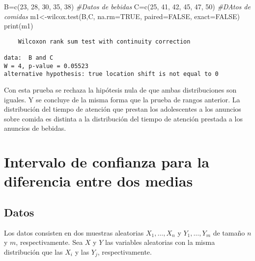 \documentclass[
  a4paper,
  oneside,
  openany]{book}
\newenvironment{Shaded}{\begin{snugshade}}{\end{snugshade}}
\newcommand{\AttributeTok}[1]{\textcolor[rgb]{0.77,0.63,0.00}{#1}}
\newcommand{\CommentTok}[1]{\textcolor[rgb]{0.56,0.35,0.01}{\textit{#1}}}
\newcommand{\ConstantTok}[1]{\textcolor[rgb]{0.00,0.00,0.00}{#1}}
\newcommand{\DecValTok}[1]{\textcolor[rgb]{0.00,0.00,0.81}{#1}}
\newcommand{\FunctionTok}[1]{\textcolor[rgb]{0.00,0.00,0.00}{#1}}
\newcommand{\NormalTok}[1]{#1}
\newcommand{\OtherTok}[1]{\textcolor[rgb]{0.56,0.35,0.01}{#1}}
\begin{document}
\begin{Shaded}
\begin{Highlighting}[]
\NormalTok{B}\OtherTok{=}\FunctionTok{c}\NormalTok{(}\DecValTok{23}\NormalTok{, }\DecValTok{28}\NormalTok{, }\DecValTok{30}\NormalTok{, }\DecValTok{35}\NormalTok{, }\DecValTok{38}\NormalTok{)     }\CommentTok{\#Datos de bebidas}
\NormalTok{C}\OtherTok{=}\FunctionTok{c}\NormalTok{(}\DecValTok{25}\NormalTok{, }\DecValTok{41}\NormalTok{, }\DecValTok{42}\NormalTok{, }\DecValTok{45}\NormalTok{, }\DecValTok{47}\NormalTok{, }\DecValTok{50}\NormalTok{) }\CommentTok{\#DAtos de comidas}
\NormalTok{m1}\OtherTok{\textless{}{-}}\FunctionTok{wilcox.test}\NormalTok{(B,C, }\AttributeTok{na.rm=}\ConstantTok{TRUE}\NormalTok{, }\AttributeTok{paired=}\ConstantTok{FALSE}\NormalTok{, }\AttributeTok{exact=}\ConstantTok{FALSE}\NormalTok{)}
\FunctionTok{print}\NormalTok{(m1)}
\end{Highlighting}
\end{Shaded}

\begin{verbatim}
    Wilcoxon rank sum test with continuity correction

data:  B and C
W = 4, p-value = 0.05523
alternative hypothesis: true location shift is not equal to 0
\end{verbatim}

Con esta prueba se rechaza la hipótesis nula de que ambas distribuciones son iguales. Y se concluye de la misma forma que la prueba de rangos anterior. La distribución del tiempo de atención que prestan los adolescentes a los anuncios sobre comida es distinta a la distribución del tiempo de atención prestada a los anuncios de bebidas.

\hypertarget{intervalo-de-confianza-para-la-diferencia-entre-dos-medias}{%
\chapter{Intervalo de confianza para la diferencia entre dos medias}\label{intervalo-de-confianza-para-la-diferencia-entre-dos-medias}}

\hypertarget{datos-6}{%
\section{Datos}\label{datos-6}}

Los datos consisten en dos muestras aleatorias \(X_{1}, \ldots, X_{n}\) y \(Y_{1}, \ldots, Y_{m}\) de tamaño \(n\) y \(m\), respectivamente. Sea \(X\) y \(Y\) las variables aleatorias con la misma distribución que las \(X_{i}\) y las \(Y_{j}\), respectivamente.
\end{document}
